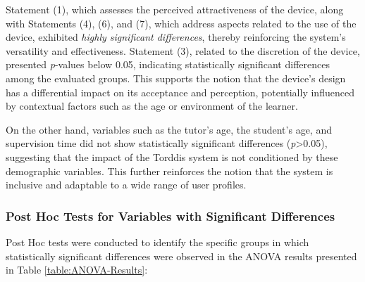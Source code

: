                 Statement (1), which assesses the perceived attractiveness of the device, along with Statements (4), (6), and (7), which address aspects related to the use of the device, exhibited \textit{highly significant differences}, thereby reinforcing the system’s versatility and effectiveness. Statement (3), related to the discretion of the device, presented \textit{p}-values below 0.05, indicating statistically significant differences among the evaluated groups. This supports the notion that the device’s design has a differential impact on its acceptance and perception, potentially influenced by contextual factors such as the age or environment of the learner.
                
                On the other hand, variables such as the tutor’s age, the student’s age, and supervision time did not show statistically significant differences (\textit{p}>0.05), suggesting that the impact of the Torddis system is not conditioned by these demographic variables. This further reinforces the notion that the system is inclusive and adaptable to a wide range of user profiles.
                
                \subsubsection{Post Hoc Tests for Variables with Significant Differences}
                Post Hoc tests \citep{Ogrodniczek2025Comparative} were conducted to identify the specific groups in which statistically significant differences were observed in the ANOVA results presented in Table \ref{table:ANOVA-Results}:
                

